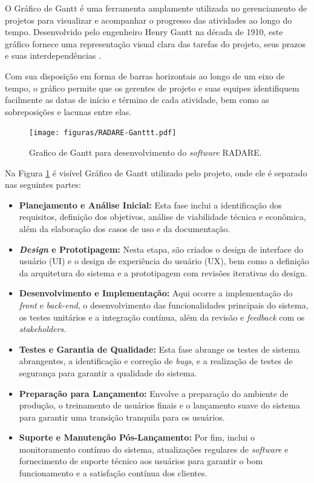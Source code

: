 O Gráfico de Gantt é uma ferramenta amplamente utilizada no gerenciamento de projetos para visualizar e acompanhar o progresso das atividades ao longo do tempo. Desenvolvido pelo engenheiro Henry Gantt na década de 1910, este gráfico fornece uma representação visual clara das tarefas do projeto, seus prazos e suas interdependências \cite{ganttchart}. 

Com sua disposição em forma de barras horizontais ao longo de um eixo de tempo, o gráfico permite que os gerentes de projeto e suas equipes identifiquem facilmente as datas de início e término de cada atividade, bem como as sobreposições e lacunas entre elas.
    
\begin{figure}[h]
    \centering
    \texttt{[image: figuras/RADARE-Ganttt.pdf]} %
    \caption{Grafico de Gantt para desenvolvimento do \textit{software} RADARE.}
    \label{fig:ganttChart}
\end{figure}    

Na Figura \ref{fig:ganttChart} é visível Gráfico de Gantt utilizado pelo projeto, onde ele é separado nas seguintes partes: 
    
\begin{itemize}
    \item \textbf{Planejamento e Análise Inicial:} Esta fase inclui a identificação dos requisitos, definição dos objetivos, análise de viabilidade técnica e econômica, além da elaboração dos casos de uso e da documentação.
    
    \item \textbf{\textit{Design} e Prototipagem:} Nesta etapa, são criados o design de interface do usuário (UI) e o design de experiência do usuário (UX), bem como a definição da arquitetura do sistema e a prototipagem com revisões iterativas do design.
    
    \item \textbf{Desenvolvimento e Implementação:} Aqui ocorre a implementação do \textit{front} e \textit{back-end}, o desenvolvimento das funcionalidades principais do sistema, os testes unitários e a integração contínua, além da revisão e \textit{feedback} com os \textit{stakeholders}.
    
    \item \textbf{Testes e Garantia de Qualidade:} Esta fase abrange os testes de sistema abrangentes, a identificação e correção de \textit{bugs}, e a realização de testes de segurança para garantir a qualidade do sistema.
    
    \item \textbf{Preparação para Lançamento:} Envolve a preparação do ambiente de produção, o treinamento de usuários finais e o lançamento suave do sistema para garantir uma transição tranquila para os usuários.
    
    \item \textbf{Suporte e Manutenção Pós-Lançamento:} Por fim, inclui o monitoramento contínuo do sistema, atualizações regulares de \textit{software} e fornecimento de suporte técnico aos usuários para garantir o bom funcionamento e a satisfação contínua dos clientes.
\end{itemize}

